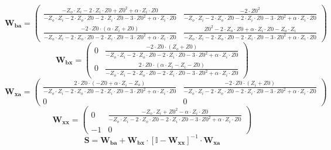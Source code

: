 \[ \mathbf{W_{ba}} = \left(\begin{smallmatrix} \frac{-Z_o\cdot Z_i-2\cdot Z_i\cdot Z0+Z0^2+\alpha\cdot Z_i\cdot Z0}{-Z_o\cdot Z_i-2\cdot Z_o\cdot Z0-2\cdot Z_i\cdot Z0-3\cdot Z0^2+\alpha\cdot Z_i\cdot Z0} & \frac{-2\cdot Z0^2}{-Z_o\cdot Z_i-2\cdot Z_o\cdot Z0-2\cdot Z_i\cdot Z0-3\cdot Z0^2+\alpha\cdot Z_i\cdot Z0} \\ \frac{-2\cdot Z0 \cdot\left(\alpha\cdot Z_i +Z0\right)}{-Z_o\cdot Z_i-2\cdot Z_o\cdot Z0-2\cdot Z_i\cdot Z0-3\cdot Z0^2+\alpha\cdot Z_i\cdot Z0} & \frac{Z0^2-2\cdot Z_o\cdot Z0+\alpha\cdot Z_i\cdot Z0-Z_o\cdot Z_i}{-Z_o\cdot Z_i-2\cdot Z_o\cdot Z0-2\cdot Z_i\cdot Z0-3\cdot Z0^2+\alpha\cdot Z_i\cdot Z0} \end{smallmatrix}\right) \]
\[ \mathbf{W_{bx}} = \left(\begin{smallmatrix} 0 & \frac{-2\cdot Z0\cdot\left(Z_o +Z0\right)}{-Z_o\cdot Z_i-2\cdot Z_o\cdot Z0-2\cdot Z_i\cdot Z0-3\cdot Z0^2+\alpha\cdot Z_i\cdot Z0} \\ 0 & \frac{2\cdot Z0\cdot\left(\alpha\cdot Z_i-Z_i-Z0\right)}{-Z_o\cdot Z_i-2\cdot Z_o\cdot Z0-2\cdot Z_i\cdot Z0-3\cdot Z0^2+\alpha\cdot Z_i\cdot Z0} \end{smallmatrix}\right) \]
\[ \mathbf{W_{xa}} = \left(\begin{smallmatrix} \frac{2\cdot Z0\cdot\left(-Z0+\alpha\cdot Z_i-Z_o\right)}{-Z_o\cdot Z_i-2\cdot Z_o\cdot Z0-2\cdot Z_i\cdot Z0-3\cdot Z0^2+\alpha\cdot Z_i\cdot Z0} & \frac{-2\cdot Z0\cdot\left(Z_i+Z0\right)}{-Z_o\cdot Z_i-2\cdot Z_o\cdot Z0-2\cdot Z_i\cdot Z0-3\cdot Z0^2+\alpha\cdot Z_i\cdot Z0} \\ 0 & 0 \end{smallmatrix}\right) \]
\[ \mathbf{W_{xx}} = \left(\begin{smallmatrix} 0 & \frac{-Z_o\cdot Z_i+Z0^2-\alpha\cdot Z_i\cdot Z0}{-Z_o\cdot Z_i-2\cdot Z_o\cdot Z0-2\cdot Z_i\cdot Z0-3\cdot Z0^2+\alpha\cdot Z_i\cdot Z0} \\ -1 & 0 \end{smallmatrix}\right) \]
\[ \mathbf{S}=\mathbf{W_{ba}}+\mathbf{W_{bx}}\cdot\left[ \mathbb{I}  -\mathbf{W_{xx}}\right]^{-1}\cdot\mathbf{W_{xa}} \]
